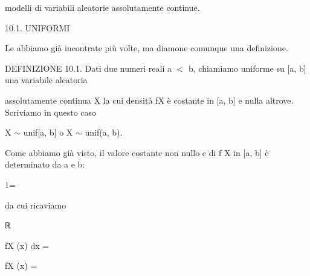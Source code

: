 \documentclass[a4paper,portrait,12pt]{article}
\begin{document}
\begin{flushleft}
modelli di variabili aleatorie assolutamente continue.
\end{flushleft}





\begin{flushleft}
10.1. UNIFORMI
\end{flushleft}


\begin{flushleft}
Le abbiamo gi\`{a} incontrate più volte, ma diamone comunque una definizione.
\end{flushleft}


\begin{flushleft}
DEFINIZIONE 10.1. Dati due numeri reali a $<$ b, chiamiamo uniforme su [a, b] una variabile aleatoria
\end{flushleft}


\begin{flushleft}
assolutamente continua X la cui densit\`{a} fX \`{e} costante in [a, b] e nulla altrove. Scriviamo in questo caso
\end{flushleft}


\begin{flushleft}
X $\sim$ unif[a, b] o X $\sim$ unif(a, b).
\end{flushleft}


\begin{flushleft}
Come abbiamo gi\`{a} visto, il valore costante non nullo c di f X in [a, b] \`{e} determinato da a e b:
\end{flushleft}


1=


\begin{flushleft}
da cui ricaviamo
\end{flushleft}





\begin{flushleft}
ℝ
\end{flushleft}





\begin{flushleft}
fX (x) dx =
\end{flushleft}





\begin{flushleft}
fX (x) =
\end{flushleft}
\end{document}

